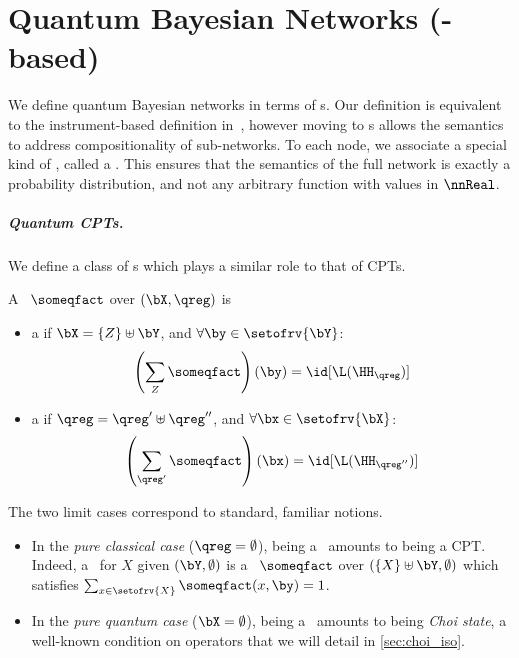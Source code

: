 \section{Quantum Bayesian Networks (\Qfactor-based)}
\label{sec:qbn}

We define quantum Bayesian networks in terms of \qfactor s.
Our definition is equivalent to the instrument-based definition in~\cite{GBN2014}, however moving to \qfactor s allows the semantics to address compositionality of sub-networks.
To each node, we associate a special kind of \qfactor, called a \qCPT.
This ensures that the semantics of the full network is exactly a probability distribution, and not any arbitrary function with values in $\nnReal$.

\subparagraph{Quantum CPTs.}

We define a class of \Qfactor s which plays a similar role to that of CPTs.

\begin{definition}[\QCPT\ (\qCPT)]
\label{def:condition_qfactor_qbn}
A \qfactor\ $\someqfact$ over $(\bX,\qreg)$ is
\begin{itemize}
\item
a  if $\bX = \{Z\} \uplus \bY$, and $\forall \by\in\setofrv{\bY}$:
\begin{equation*}
\left(\sum_{Z} \someqfact\right)(\by)
=
\id[\L(\HH_\qreg)]
\end{equation*}
\item
a  if $\qreg = \qreg' \uplus \qreg''$, and $\forall \bx\in\setofrv{\bX}$:
\begin{equation*}
\left(\sum_{\qreg'} \someqfact\right)(\bx)
=
\id[\L(\HH_{\qreg''})]
\end{equation*}
\end{itemize}
\end{definition}

The two limit cases correspond to standard, familiar notions.
\begin{itemize}
\item
In the \emph{pure classical case} ($\qreg=\emptyset$), being a \qCPT\ amounts to being a CPT.
Indeed, a \qCPT\ for $X$ given $(\bY, \emptyset)$ is a \qfactor\ $\someqfact$ over $(\{X\}\uplus\bY,\emptyset)$ which satisfies $\sum_{x\in\setofrv{X}} \someqfact(x,\by) = 1$.
\item
In the \emph{pure quantum case} ($\bX=\emptyset$), being a \qCPT\ amounts to being \emph{Choi state}, a well-known condition on operators that we will detail in \cref{sec:choi_iso}.
\end{itemize}

